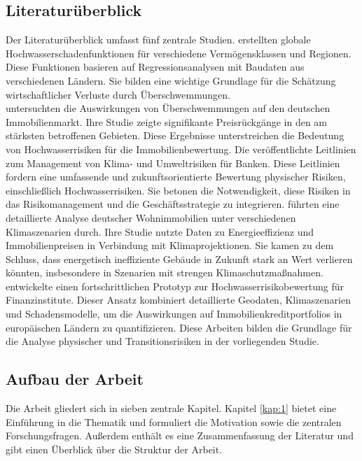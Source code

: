 \subsection{Literaturüberblick }
Der Literaturüberblick umfasst fünf zentrale Studien. \textcite{huizinga2017global} erstellten globale Hochwasserschadenfunktionen für verschiedene Vermögensklassen und Regionen. Diese Funktionen basieren auf Regressionsanalysen mit Baudaten aus verschiedenen Ländern. Sie bilden eine wichtige Grundlage für die Schätzung wirtschaftlicher Verluste durch Überschwemmungen.\\ \textcite{moore2022flood} untersuchten die Auswirkungen von Überschwemmungen auf den deutschen Immobilienmarkt. Ihre Studie zeigte signifikante Preisrückgänge in den am stärksten betroffenen Gebieten. Diese Ergebnisse unterstreichen die Bedeutung von Hochwasserrisiken für die Immobilienbewertung. Die \textcite{ECB2022ClimateStressTest} veröffentlichte Leitlinien zum Management von Klima- und Umweltrisiken für Banken. Diese Leitlinien fordern eine umfassende und zukunftsorientierte Bewertung physischer Risiken, einschließlich Hochwasserrisiken. Sie betonen die Notwendigkeit, diese Risiken in das Risikomanagement und die Geschäftsstrategie zu integrieren. \textcite{tergerman} führten eine detaillierte Analyse deutscher Wohnimmobilien unter verschiedenen Klimaszenarien durch. Ihre Studie nutzte Daten zu Energieeffizienz und Immobilienpreisen in Verbindung mit Klimaprojektionen. Sie kamen zu dem Schluss, dass energetisch ineffiziente Gebäude in Zukunft stark an Wert verlieren könnten, insbesondere in Szenarien mit strengen Klimaschutzmaßnahmen. \textcite{vanweddingen2023physicalrisk} entwickelte einen fortschrittlichen Prototyp zur Hochwasserrisikobewertung für Finanzinstitute. Dieser Ansatz kombiniert detaillierte Geodaten, Klimaszenarien und Schadensmodelle, um die Auswirkungen auf Immobilienkreditportfolios in europäischen Ländern zu quantifizieren. Diese Arbeiten bilden die Grundlage für die Analyse physischer und Transitionsrisiken in der vorliegenden Studie.
\subsection{Aufbau der Arbeit}

Die Arbeit gliedert sich in sieben zentrale Kapitel. Kapitel \ref{kap:1} bietet eine Einführung in die Thematik und formuliert die Motivation sowie die zentralen Forschungsfragen. Außerdem enthält es eine Zusammenfassung der Literatur und gibt einen Überblick über die Struktur der Arbeit.


